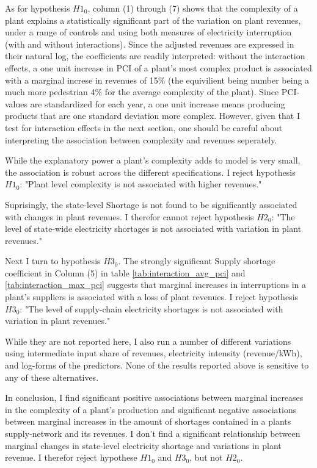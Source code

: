 \documentclass[11pt]{article}
\begin{document}
As for hypothesis $H1_0$, column (1) through (7) shows that the complexity of a plant explains a statistically significant part of the variation on plant revenues, under a range of controls and using both measures of electricity interruption (with and without interactions). Since the adjusted revenues are expressed in their natural log, the coefficients are readily interpreted: without the interaction effects, a one unit increase in PCI of a plant's most complex product is associated with a marginal increse in revenues of 15\% (the equivilient being number being a much more pedestrian 4\% for the average complexity of the plant). Since PCI-values are standardized for each year, a one unit increase means producing products that are one standard deviation more complex. However, given that I test for interaction effects in the next section, one should be careful about interpreting the association between complexity and revenues seperately. 

While the explanatory power a plant's complexity adds to model is very small, the association is robust across the different specifications. I reject hypothesis $H1_0$: "Plant level complexity is not associated with higher revenues."

Suprisingly, the state-level Shortage is not found to be significantly associated with changes in plant revenues. I therefor cannot reject hypothesis $H2_0$: "The level of state-wide electricity shortages is not associated with variation in plant revenues." 

Next I turn to hypothesis $H3_0$. The strongly significant Supply shortage coefficient in Column (5) in table \ref{tab:interaction_avg_pci} and \ref{tab:interaction_max_pci} suggests that marginal increases in interruptions in a plant's suppliers is associated with a loss of plant revenues. I reject hypothesis $H3_0$: "The level of supply-chain electricity shortages is not associated with variation in plant revenues." 

While they are not reported here, I also run a number of different variations using intermediate input share of revenues, electricity intensity (revenue/kWh), and log-forms of the predictors. None of the results reported above is sensitive to any of these alternatives.

In conclusion, I find significant positive associations between marginal increases in the complexity of a plant's production and significant negative associations between marginal increases in the amount of shortages contained in a plants supply-network and its revenues. I don't find a significant relationship between marginal changes in state-level electricity shortage and variations in plant revenue. I therefor reject hypothese $H1_0$ and $H3_0$, but not $H2_0$.
\end{document}
